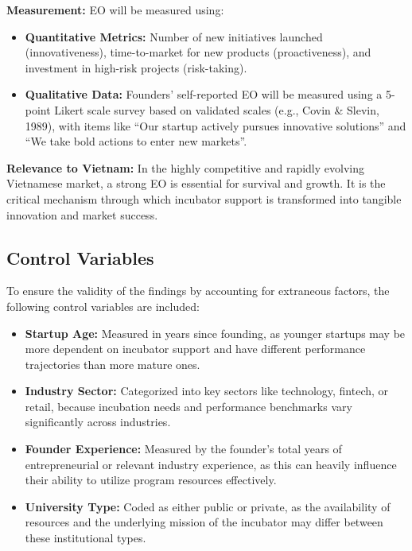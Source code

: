 \documentclass[../Main.tex]{subfiles}
\begin{document}
    \textbf{Measurement:} EO will be measured using:
    \begin{itemize}
        \item \textbf{Quantitative Metrics:} Number of new initiatives launched (innovativeness), time-to-market for new products (proactiveness), and investment in high-risk projects (risk-taking).
        \item \textbf{Qualitative Data:} Founders' self-reported EO will be measured using a 5-point Likert scale survey based on validated scales (e.g., Covin \& Slevin, 1989), with items like ``Our startup actively pursues innovative solutions'' and ``We take bold actions to enter new markets''.
    \end{itemize}
    
    \textbf{Relevance to Vietnam:} In the highly competitive and rapidly evolving Vietnamese market, a strong EO is essential for survival and growth. It is the critical mechanism through which incubator support is transformed into tangible innovation and market success.

    \subsection{Control Variables}
    
    To ensure the validity of the findings by accounting for extraneous factors, the following control variables are included:
    
    \begin{itemize}
        \item \textbf{Startup Age:} Measured in years since founding, as younger startups may be more dependent on incubator support and have different performance trajectories than more mature ones.
        \item \textbf{Industry Sector:} Categorized into key sectors like technology, fintech, or retail, because incubation needs and performance benchmarks vary significantly across industries.
        \item \textbf{Founder Experience:} Measured by the founder's total years of entrepreneurial or relevant industry experience, as this can heavily influence their ability to utilize program resources effectively.
        \item \textbf{University Type:} Coded as either public or private, as the availability of resources and the underlying mission of the incubator may differ between these institutional types.
    \end{itemize}
\end{document}
